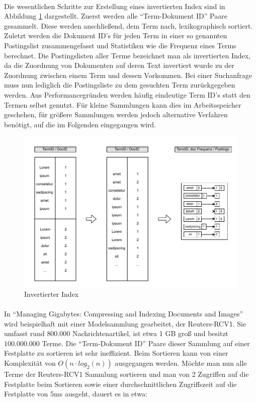 \paragraph{}
Die wesentlichen Schritte zur Erstellung eines invertierten Index sind in Abbildung \ref{postingssList} dargestellt. Zuerst werden alle \enquote{Term-Dokument ID} Paare gesammelt. Diese werden anschließend, dem Term nach, lexikographisch sortiert. Zuletzt werden die Dokument ID's für jeden Term in einer so genannten Postingslist zusammengefasst und Statistiken wie die Frequenz eines Terms berechnet. Die Postingslisten aller Terme bezeichnet man als invertierten Index, da die Zuordnung von Dokumenten auf deren Text invertiert wurde zu der Zuordnung zwischen einem Term und dessen Vorkommen. Bei einer Suchanfrage muss nun lediglich die Postingsliste zu dem gesuchten Term zurückgegeben werden. Aus Performancegründen werden häufig eindeutige Term ID's statt den Termen selbst genutzt. Für kleine Sammlungen kann dies im Arbeitsspeicher geschehen, für größere Sammlungen werden jedoch alternative Verfahren benötigt, auf die im Folgenden eingegangen wird.
\par

\begin{figure}[ht]
  \includegraphics[width=\textwidth]{pdf/postingslist3.pdf}
  \caption{Invertierter Index}
  \label{postingssList}
\end{figure}

\paragraph{}
In \enquote{Managing Gigabytes: Compressing and Indexing Documents and Images}\cite{ir} wird beispielhaft mit einer Modelsammlung gearbeitet, der Reuters-RCV1. Sie umfasst rund $800.000$ Nachrichtenartikel, ist etwa 1 GB groß und besitzt $100.000.000$ Terme. Die \enquote{Term-Dokument ID} Paare dieser Sammlung auf einer Festplatte zu sortieren ist sehr ineffizient. Beim Sortieren kann von einer Komplexität von $O(n \cdot log_2 (n))$ ausgegangen werden. Möchte man nun alle Terme der Reuters-RCV1 Sammlung sortieren und man von 2 Zugriffen auf die Festplatte beim Sortieren sowie einer durchschnittlichen Zugriffszeit auf die Festplatte von 5ms ausgeht, dauert es in etwa:

